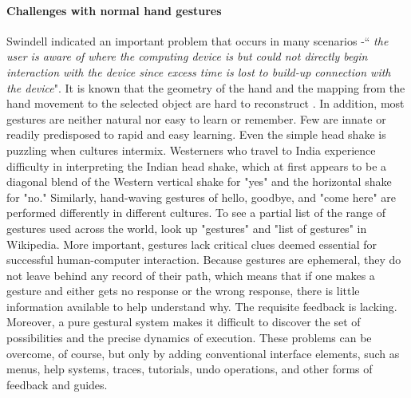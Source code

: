 \paragraph{Challenges with normal hand gestures}
Swindell\cite{Swindells2002} indicated an important problem that occurs in many scenarios -`` \textit{the user is aware of where the computing device is but could not directly begin interaction with the device since excess time is lost to build-up connection with the device}". It is known that the geometry of the hand and the mapping from the hand movement to the selected object are hard to reconstruct \cite{Raheja2011}.
In addition, most gestures are neither natural nor easy to learn or remember. Few are innate or readily predisposed to rapid and easy learning. Even the simple head shake is puzzling when cultures intermix. Westerners who travel to India experience difficulty in interpreting the Indian head shake, which at first appears to be a diagonal blend of the Western vertical shake for "yes" and the horizontal shake for "no." Similarly, hand-waving gestures of hello, goodbye, and "come here" are performed differently in different cultures. To see a partial list of the range of gestures used across the world, look up "gestures" and "list of gestures" in Wikipedia.
More important, gestures lack critical clues deemed essential for successful human-computer interaction. Because gestures are ephemeral, they do not leave behind any record of their path, which means that if one makes a gesture and either gets no response or the wrong response, there is little information available to help understand why. The requisite feedback is lacking. Moreover, a pure gestural system makes it difficult to discover the set of possibilities and the precise dynamics of execution. These problems can be overcome, of course, but only by adding conventional interface elements, such as menus, help systems, traces, tutorials, undo operations, and other forms of feedback and guides.

